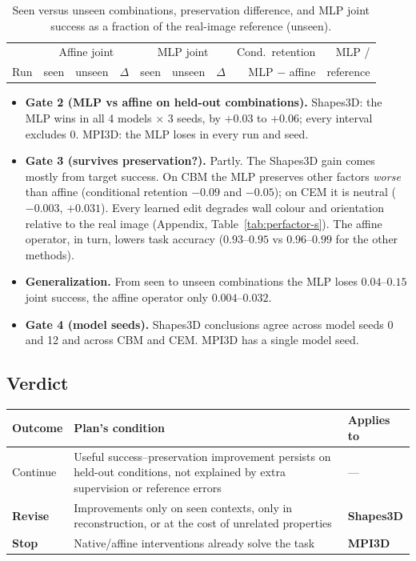 \documentclass[11pt,a4paper]{article}
\begin{document}
\begin{table}[H]
\centering\footnotesize
\begin{tabular}{lrrrrrrrr}
\toprule
& \multicolumn{3}{c}{Affine joint} & \multicolumn{3}{c}{MLP joint} & Cond.\ retention & MLP / \\
\cmidrule(lr){2-4}\cmidrule(lr){5-7}
Run & seen & unseen & $\Delta$ & seen & unseen & $\Delta$ & MLP $-$ affine & reference \\
\midrule

\bottomrule
\end{tabular}
\caption{Seen versus unseen combinations, preservation difference, and MLP joint success as a fraction of the
real-image reference (unseen).}
\label{tab:seen}
\end{table}

\begin{itemize}
\item \textbf{Gate 2 (MLP vs affine on held-out combinations).} Shapes3D: the MLP wins in all 4 models $\times$ 3
  seeds, by $+0.03$ to $+0.06$; every interval excludes 0. MPI3D: the MLP loses in every run and seed.
\item \textbf{Gate 3 (survives preservation?).} Partly. The Shapes3D gain comes mostly from target success. On CBM
  the MLP preserves other factors \emph{worse} than affine (conditional retention $-0.09$ and $-0.05$); on CEM it is
  neutral ($-0.003$, $+0.031$). Every learned edit degrades wall colour and orientation relative to the real image
  (Appendix, Table~\ref{tab:perfactor-s}). The affine operator, in turn, lowers task accuracy ($0.93$--$0.95$ vs
  $0.96$--$0.99$ for the other methods).
\item \textbf{Generalization.} From seen to unseen combinations the MLP loses $0.04$--$0.15$ joint success, the affine
  operator only $0.004$--$0.032$.
\item \textbf{Gate 4 (model seeds).} Shapes3D conclusions agree across model seeds 0 and 12 and across CBM and CEM.
  MPI3D has a single model seed.
\end{itemize}

\subsection{Verdict}

\begin{table}[H]
\centering\small
\begin{tabularx}{\textwidth}{p{2.2cm}L p{2.2cm}}
\toprule
Outcome & Plan's condition & Applies to \\
\midrule
Continue & Useful success--preservation improvement persists on held-out conditions, not explained by extra supervision or reference errors & --- \\
\textbf{Revise} & Improvements only on seen contexts, only in reconstruction, or at the cost of unrelated properties & \textbf{Shapes3D} \\
\textbf{Stop} & Native/affine interventions already solve the task & \textbf{MPI3D} \\
\bottomrule
\end{tabularx}
\end{table}
\end{document}
